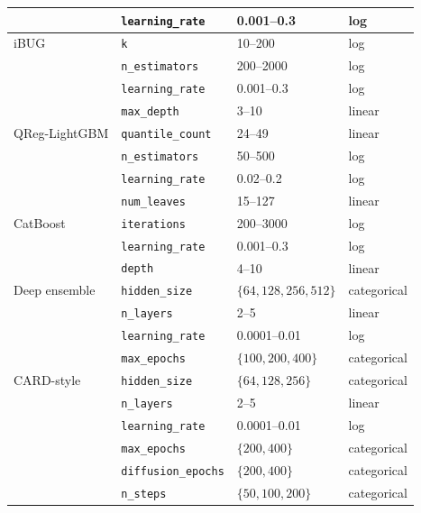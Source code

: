 \documentclass{article}
\begin{document}
\begin{table}[!h]
\begin{tabular}{llll}
                & \texttt{learning\_rate}    & 0.001--0.3 & log \\
    \midrule
    iBUG        & \texttt{k}                 & 10--200 & log \\
                & \texttt{n\_estimators}     & 200--2000 & log \\
                & \texttt{learning\_rate}    & 0.001--0.3 & log \\
                & \texttt{max\_depth}        & 3--10 & linear \\
    \midrule
    QReg-LightGBM & \texttt{quantile\_count} & 24--49 & linear \\
                   & \texttt{n\_estimators}   & 50--500 & log \\
                   & \texttt{learning\_rate}  & 0.02--0.2 & log \\
                   & \texttt{num\_leaves}     & 15--127 & linear \\
    \midrule
    CatBoost    & \texttt{iterations}        & 200--3000 & log \\
                & \texttt{learning\_rate}    & 0.001--0.3 & log \\
                & \texttt{depth}             & 4--10 & linear \\
    \midrule
    Deep ensemble & \texttt{hidden\_size}    & $\{64, 128, 256, 512\}$ & categorical \\
                  & \texttt{n\_layers}       & 2--5 & linear \\
                  & \texttt{learning\_rate}  & 0.0001--0.01 & log \\
                  & \texttt{max\_epochs}     & $\{100, 200, 400\}$ & categorical \\
    \midrule
    CARD-style  & \texttt{hidden\_size}      & $\{64, 128, 256\}$ & categorical \\
                & \texttt{n\_layers}         & 2--5 & linear \\
                & \texttt{learning\_rate}    & 0.0001--0.01 & log \\
                & \texttt{max\_epochs}       & $\{200, 400\}$ & categorical \\
                & \texttt{diffusion\_epochs} & $\{200, 400\}$ & categorical \\
                & \texttt{n\_steps}          & $\{50, 100, 200\}$ & categorical \\
    \bottomrule
  \end{tabular}
\end{table}
\end{document}
